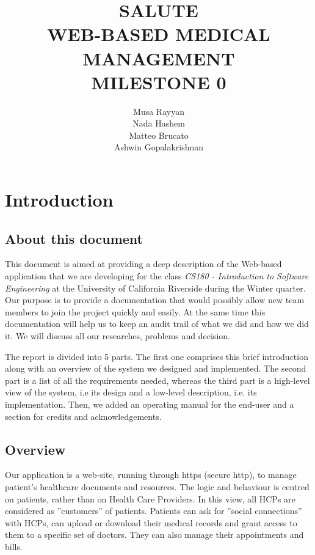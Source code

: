 \documentclass[12pt]{report}
\title{SALUTE \\ WEB-BASED MEDICAL MANAGEMENT \\ MILESTONE 0}
\author{Musa Rayyan \\ Nada Hashem \\ Matteo Brucato \\ Ashwin Gopalakrishnan}
\begin{document}
\maketitle
\tableofcontents


\part{Introduction}

\chapter{About this document}

This document is aimed at providing a deep description of the Web-based application that we are developing for the class \emph{CS180 - Introduction to Software Engineering} at the University of California Riverside during the Winter quarter. Our purpose is to provide a documentation that would possibly allow new team members to join the project quickly and easily. At the same time this documentation will help us to keep an audit trail of what we did and how we did it. We will discuss all our researches, problems and decision.

The report is divided into 5 parts. The first one comprises this brief introduction along with an overview of the system we designed and implemented. The second part is a list of all the requirements needed, whereas the third part is a high-level view of the system, i.e its design and a low-level description, i.e. its implementation. Then, we added an operating manual for the end-user and a section for credits and acknowledgements.

\chapter{Overview}
Our application is a web-site, running through https (secure http), to manage patient's healthcare documents and resources. The logic and behaviour is centred on patients, rather than on Health Care Providers. In this view, all HCPs are considered as ''customers'' of patients. Patients can ask for ''social connections'' with HCPs, can upload or download their medical records and grant access to them to a specific set of doctors. They can also manage their appointments and bills.
\end{document}
